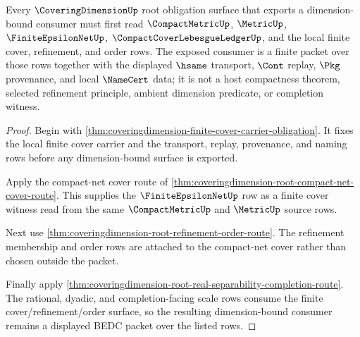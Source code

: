 \begin{theorem}
\label{thm:covering-dimension-compact-net-obligation-surface}
Every $\CoveringDimensionUp$ root obligation surface that exports a dimension-bound consumer must first read $\CompactMetricUp$, $\MetricUp$, $\FiniteEpsilonNetUp$, $\CompactCoverLebesgueLedgerUp$, and the local finite cover, refinement, and order rows. The exposed consumer is a finite packet over those rows together with the displayed $\hsame$ transport, $\Cont$ replay, $\Pkg$ provenance, and local $\NameCert$ data; it is not a host compactness theorem, selected refinement principle, ambient dimension predicate, or completion witness.
\end{theorem}
\begin{proof}
Begin with \autoref{thm:coveringdimension-finite-cover-carrier-obligation}. It fixes the local finite cover carrier and the transport, replay, provenance, and naming rows before any dimension-bound surface is exported.

Apply the compact-net cover route of \autoref{thm:coveringdimension-root-compact-net-cover-route}. This supplies the $\FiniteEpsilonNetUp$ row as a finite cover witness read from the same $\CompactMetricUp$ and $\MetricUp$ source rows.

Next use \autoref{thm:coveringdimension-root-refinement-order-route}. The refinement membership and order rows are attached to the compact-net cover rather than chosen outside the packet.

Finally apply \autoref{thm:coveringdimension-root-real-separability-completion-route}. The rational, dyadic, and completion-facing scale rows consume the finite cover/refinement/order surface, so the resulting dimension-bound consumer remains a displayed BEDC packet over the listed rows.
\end{proof}

